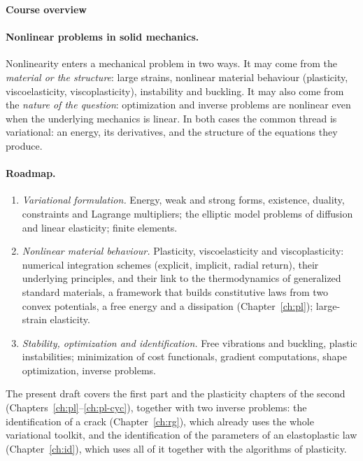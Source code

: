 \cleardoublepage
{}
{}
\thispagestyle{plain}

\noindent{\color{gray!70!black}\rule{\textwidth}{0.6pt}}\par\vspace{6pt}\noindent
{\sffamily\bfseries\Huge Course overview\par}
\vspace{18pt}

\paragraph{Nonlinear problems in solid mechanics.}
Nonlinearity enters a mechanical problem in two ways. It may come from the
\emph{material or the structure}: large strains, nonlinear material behaviour
(plasticity, viscoelasticity, viscoplasticity), instability and buckling.
It may also come from the \emph{nature of the question}: optimization and
inverse problems are nonlinear even when the underlying mechanics is linear.
In both cases the common thread is variational: an energy, its derivatives,
and the structure of the equations they produce.

\paragraph{Roadmap.}
\begin{enumerate}[itemsep=2pt]
  \item \emph{Variational formulation.} Energy, weak and strong forms,
  existence, duality, constraints and Lagrange multipliers; the elliptic
  model problems of diffusion and linear elasticity; finite elements.
  \item \emph{Nonlinear material behaviour.} Plasticity, viscoelasticity and
  viscoplasticity: numerical integration schemes (explicit, implicit, radial
  return), their underlying principles, and their link to the thermodynamics
  of generalized standard materials, a framework that builds constitutive
  laws from two convex potentials, a free energy and a dissipation
  (Chapter~\ref{ch:pl}); large-strain elasticity.
  \item \emph{Stability, optimization and identification.} Free vibrations
  and buckling, plastic instabilities; minimization of cost functionals,
  gradient computations, shape optimization, inverse problems.
\end{enumerate}
The present draft covers the first part and the plasticity chapters of the
second (Chapters~\ref{ch:pl}--\ref{ch:pl-cyc}), together with two inverse problems: the identification of a crack (Chapter~\ref{ch:rg}),
which already uses the whole variational toolkit, and the identification of
the parameters of an elastoplastic law (Chapter~\ref{ch:id}), which uses all of it together with the
algorithms of plasticity.


